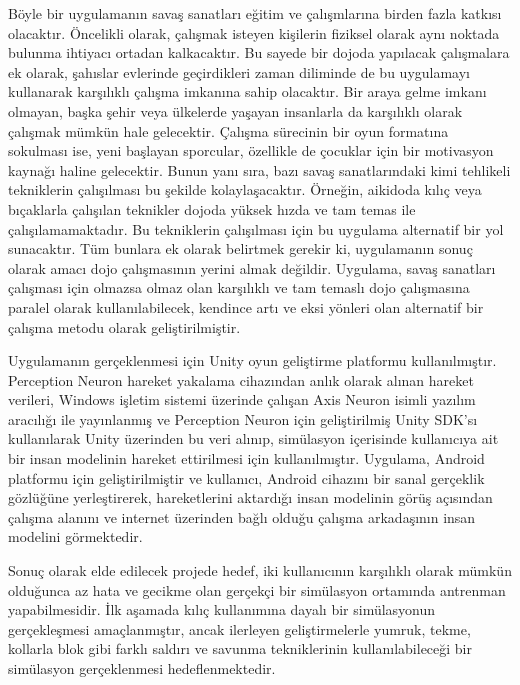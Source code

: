 \documentclass[a4paper, 12pt, titlepage]{article}
\begin{document}
Böyle bir uygulamanın savaş sanatları eğitim ve çalışmlarına birden fazla katkısı olacaktır.
Öncelikli olarak, çalışmak isteyen kişilerin fiziksel olarak aynı noktada bulunma ihtiyacı ortadan
kalkacaktır. Bu sayede bir dojoda yapılacak çalışmalara ek olarak, şahıslar evlerinde geçirdikleri
zaman diliminde de bu uygulamayı kullanarak karşılıklı çalışma imkanına sahip olacaktır. Bir araya
gelme imkanı olmayan, başka şehir veya ülkelerde yaşayan insanlarla da karşılıklı olarak çalışmak
mümkün hale gelecektir. Çalışma sürecinin bir oyun formatına sokulması ise, yeni başlayan
sporcular, özellikle de çocuklar için bir motivasyon kaynağı haline gelecektir. Bunun yanı sıra,
bazı savaş sanatlarındaki kimi tehlikeli tekniklerin çalışılması bu şekilde kolaylaşacaktır.
Örneğin, aikidoda kılıç veya bıçaklarla çalışılan teknikler dojoda yüksek hızda ve tam temas ile
çalışılamamaktadır. Bu tekniklerin çalışılması için bu uygulama alternatif bir yol sunacaktır. Tüm
bunlara ek olarak belirtmek gerekir ki, uygulamanın sonuç olarak amacı dojo çalışmasının yerini
almak değildir. Uygulama, savaş sanatları çalışması için olmazsa olmaz olan karşılıklı ve tam
temaslı dojo çalışmasına paralel olarak kullanılabilecek, kendince artı ve eksi yönleri olan
alternatif bir çalışma metodu olarak geliştirilmiştir.

Uygulamanın gerçeklenmesi için Unity oyun geliştirme platformu kullanılmıştır. Perception Neuron
hareket yakalama cihazından anlık olarak alınan hareket verileri, Windows işletim sistemi üzerinde
çalışan Axis Neuron isimli yazılım aracılığı ile yayınlanmış ve Perception Neuron için
geliştirilmiş Unity SDK’sı kullanılarak Unity üzerinden bu veri alınıp, simülasyon içerisinde
kullanıcıya ait bir insan modelinin hareket ettirilmesi için kullanılmıştır. Uygulama, Android
platformu için geliştirilmiştir ve kullanıcı, Android cihazını bir sanal gerçeklik gözlüğüne
yerleştirerek, hareketlerini aktardığı insan modelinin görüş açısından çalışma alanını ve internet
üzerinden bağlı olduğu çalışma arkadaşının insan modelini görmektedir.

Sonuç olarak elde edilecek projede hedef, iki kullanıcının karşılıklı olarak mümkün olduğunca az
hata ve gecikme olan gerçekçi bir simülasyon ortamında antrenman yapabilmesidir. İlk aşamada kılıç
kullanımına dayalı bir simülasyonun gerçekleşmesi amaçlanmıştır, ancak ilerleyen geliştirmelerle
yumruk, tekme, kollarla blok gibi farklı saldırı ve savunma tekniklerinin kullanılabileceği bir
simülasyon gerçeklenmesi hedeflenmektedir.

\newpage
\end{document}
